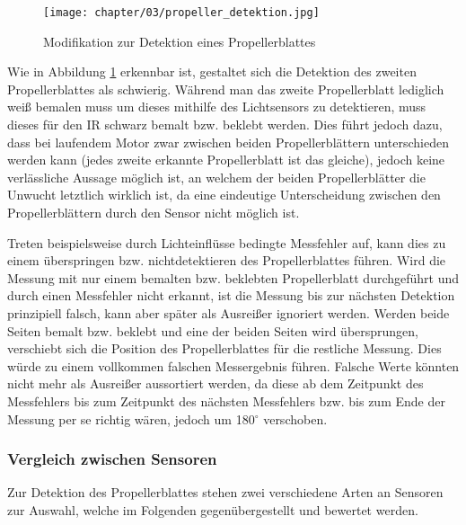 \begin{figure}[h]
	\centering
	\texttt{[image: chapter/03/propeller\_detektion.jpg]}
	\caption{Modifikation zur Detektion eines Propellerblattes}
	\label{fig:propeller_detektion}
\end{figure}
Wie in Abbildung \ref{fig:propeller_detektion} erkennbar ist, gestaltet sich die Detektion des zweiten Propellerblattes als schwierig. 
Während man das zweite Propellerblatt lediglich weiß bemalen muss um dieses mithilfe des Lichtsensors zu detektieren, muss dieses für den \ac{IR} schwarz bemalt bzw. beklebt werden.
Dies führt jedoch dazu, dass bei laufendem Motor zwar zwischen beiden Propellerblättern unterschieden werden kann (jedes zweite erkannte Propellerblatt ist das gleiche), jedoch keine verlässliche Aussage möglich ist, an welchem der beiden Propellerblätter die Unwucht letztlich wirklich ist, da eine eindeutige Unterscheidung zwischen den Propellerblättern durch den Sensor nicht möglich ist.

Treten beispielsweise durch Lichteinflüsse bedingte Messfehler auf, kann dies zu einem überspringen bzw. nichtdetektieren des Propellerblattes führen.
Wird die Messung mit nur einem bemalten bzw. beklebten Propellerblatt durchgeführt und durch einen Messfehler nicht erkannt, ist die Messung bis zur nächsten Detektion prinzipiell falsch, kann aber später als Ausreißer ignoriert werden.
Werden beide Seiten bemalt bzw. beklebt und eine der beiden Seiten wird übersprungen, verschiebt sich die Position des Propellerblattes für die restliche Messung.
Dies würde zu einem vollkommen falschen Messergebnis führen.
Falsche Werte könnten nicht mehr als Ausreißer aussortiert werden, da diese ab dem Zeitpunkt des Messfehlers bis zum Zeitpunkt des nächsten Messfehlers bzw. bis zum Ende der Messung per se richtig wären, jedoch um 180$^\circ$ verschoben.

\subsubsection*{Vergleich zwischen Sensoren}
Zur Detektion des Propellerblattes stehen zwei verschiedene Arten an Sensoren zur Auswahl, welche im Folgenden gegenübergestellt und bewertet werden.

